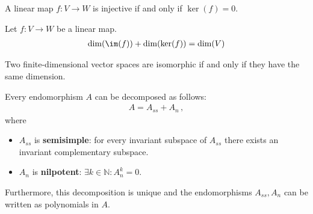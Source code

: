     \begin{property}
        A linear map $f:V\rightarrow W$ is injective if and only if $\ker(f)=0$.
    \end{property}


    \begin{theorem}\label{linalgebra:dimension_theorem}
        Let $f:V\rightarrow W$ be a linear map.
        \begin{gather}
            \dim(\im(f)) + \dim(\ker(f)) = \dim(V)
        \end{gather}
    \end{theorem}
    \begin{result}\label{linalgebra:dimension_isomorphism}
        Two finite-dimensional vector spaces are isomorphic if and only if they have the same dimension.
    \end{result}

    \begin{property}\label{linalgebra:jordan_chevalley}
        Every endomorphism $A$ can be decomposed as follows:
        \begin{gather}
            A = A_{ss} + A_n\,,
        \end{gather}
        where
        \begin{itemize}
            \item $A_{ss}$ is \textbf{semisimple}: for every invariant subspace of $A_{ss}$ there exists an invariant complementary subspace.
            \item $A_n$ is \textbf{nilpotent}: $\exists k\in\mathbb{N}:A_n^k = 0$.
        \end{itemize}
        Furthermore, this decomposition is unique and the endomorphisms $A_{ss},A_n$ can be written as polynomials in $A$.
    \end{property}

